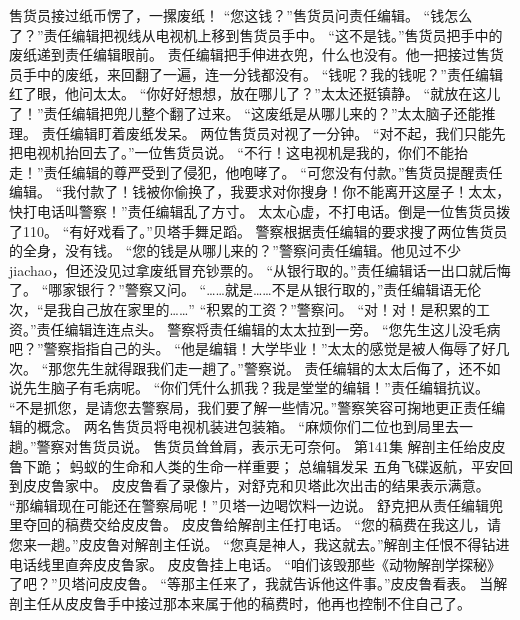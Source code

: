 \documentclass[a4paper,12pt,UTF8,twoside]{ctexbook}
\begin{document}
        售货员接过纸币愣了，一摞废纸！ 
        “您这钱？”售货员问责任编辑。 
        “钱怎么了？”责任编辑把视线从电视机上移到售货员手中。 
        “这不是钱。”售货员把手中的废纸递到责任编辑眼前。 
        责任编辑把手伸进衣兜，什么也没有。他一把接过售货员手中的废纸，来回翻了一遍，连一分钱都没有。 
        “钱呢？我的钱呢？”责任编辑红了眼，他问太太。 
        “你好好想想，放在哪儿了？”太太还挺镇静。 
        “就放在这儿了！”责任编辑把兜儿整个翻了过来。 
        “这废纸是从哪儿来的？”太太脑子还能推理。 
        责任编辑盯着废纸发呆。 
        两位售货员对视了一分钟。 
        “对不起，我们只能先把电视机抬回去了。”一位售货员说。 
        “不行！这电视机是我的，你们不能抬走！”责任编辑的尊严受到了侵犯，他咆哮了。 
        “可您没有付款。”售货员提醒责任编辑。 
        “我付款了！钱被你偷换了，我要求对你搜身！你不能离开这屋子！太太，快打电话叫警察！”责任编辑乱了方寸。 
        太太心虚，不打电话。倒是一位售货员拨了110。 
        “有好戏看了。”贝塔手舞足蹈。 
        警察根据责任编辑的要求搜了两位售货员的全身，没有钱。 
        “您的钱是从哪儿来的？”警察问责任编辑。他见过不少jiachao，但还没见过拿废纸冒充钞票的。 
        “从银行取的。”责任编辑话一出口就后悔了。 
        “哪家银行？”警察又问。 
        “……就是……不是从银行取的，”责任编辑语无伦次，“是我自己放在家里的……” 
        “积累的工资？”警察问。 
        “对！对！是积累的工资。”责任编辑连连点头。 
        警察将责任编辑的太太拉到一旁。 
        “您先生这儿没毛病吧？”警察指指自己的头。 
        “他是编辑！大学毕业！”太太的感觉是被人侮辱了好几次。 
        “那您先生就得跟我们走一趟了。”警察说。 
        责任编辑的太太后侮了，还不如说先生脑子有毛病呢。 
        “你们凭什么抓我？我是堂堂的编辑！”责任编辑抗议。 
        “不是抓您，是请您去警察局，我们要了解一些情况。”警察笑容可掬地更正责任编辑的概念。 
        两名售货员将电视机装进包装箱。 
        “麻烦你们二位也到局里去一趟。”警察对售货员说。 
        售货员耸耸肩，表示无可奈何。   第141集 
        解剖主任绐皮皮鲁下跪； 
        蚂蚁的生命和人类的生命一样重要； 
        总编辑发呆 
        五角飞碟返航，平安回到皮皮鲁家中。 
        皮皮鲁看了录像片，对舒克和贝塔此次出击的结果表示满意。 
        “那编辑现在可能还在警察局呢！”贝塔一边喝饮料一边说。 
        舒克把从责任编辑兜里夺回的稿费交给皮皮鲁。 
        皮皮鲁给解剖主任打电话。 
        “您的稿费在我这儿，请您来一趟。”皮皮鲁对解剖主任说。 
        “您真是神人，我这就去。”解剖主任恨不得钻进电话线里直奔皮皮鲁家。 
        皮皮鲁挂上电话。 
        “咱们该毁那些《动物解剖学探秘》了吧？”贝塔问皮皮鲁。 
        “等那主任来了，我就告诉他这件事。”皮皮鲁看表。 
        当解剖主任从皮皮鲁手中接过那本来属于他的稿费时，他再也控制不住自己了。 
\end{document}
